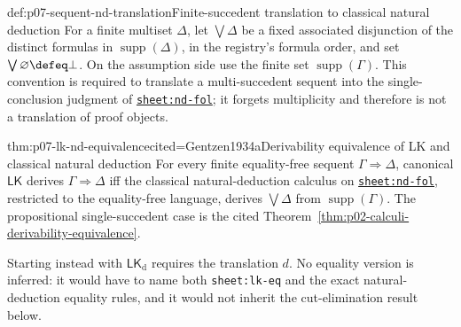 \begin{hbdefinition}{def:p07-sequent-nd-translation}{Finite-succedent translation to classical natural deduction}
For a finite multiset \(\Delta\), let \(\bigvee\Delta\) be a fixed associated
disjunction of the distinct formulas in \(\operatorname{supp}(\Delta)\), in
the registry's formula order, and set
\(\bigvee\varnothing\defeq\bot\).  On the assumption side use the finite set
\(\operatorname{supp}(\Gamma)\).  This convention is required to translate
a multi-succedent sequent into the single-conclusion judgment of
\hyperref[sheet:nd-fol]{\texttt{sheet:nd-fol}}; it forgets multiplicity and
therefore is not a translation of proof objects.
\end{hbdefinition}

\begin{hbtheorem}{thm:p07-lk-nd-equivalence}{cited=Gentzen1934a}{Derivability equivalence of LK and classical natural deduction}
For every finite equality-free sequent \(\Gamma\Rightarrow\Delta\), canonical
\(\mathsf{LK}\) derives \(\Gamma\Rightarrow\Delta\) iff the classical
natural-deduction calculus on
\hyperref[sheet:nd-fol]{\texttt{sheet:nd-fol}}, restricted to the
equality-free language, derives \(\bigvee\Delta\) from
\(\operatorname{supp}(\Gamma)\).  The propositional single-succedent case is
the cited Theorem~\ref{thm:p02-calculi-derivability-equivalence}.
\end{hbtheorem}

Starting instead with \(\mathsf{LK}_{\mathrm d}\) requires the translation
\(d\).  No equality version is inferred: it would have to name both
\texttt{sheet:lk-eq} and the exact natural-deduction equality rules, and it
would not inherit the cut-elimination result below.

